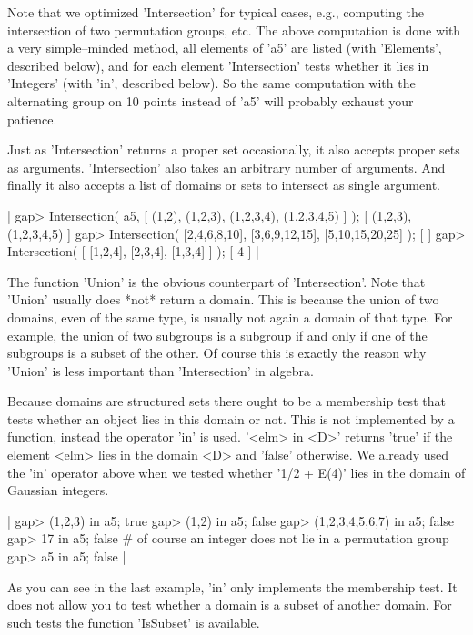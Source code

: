 Note  that we optimized 'Intersection' for typical cases, e.g., computing
the intersection  of two permutation  groups, etc.  The above computation
is  done with  a  very  simple--minded  method, all elements of  'a5' are
listed  (with   'Elements',  described  below),  and   for  each  element
'Intersection' tests  whether it lies in 'Integers' (with 'in', described
below).   So the same computation with the alternating group on 10 points
instead of 'a5' will probably exhaust your patience.

Just as 'Intersection' returns a proper set occasionally, it also accepts
proper sets as arguments.  'Intersection' also takes  an arbitrary number
of arguments.  And finally it also accepts  a list of  domains or sets to
intersect as single argument.

|    gap> Intersection( a5, [ (1,2), (1,2,3), (1,2,3,4), (1,2,3,4,5) ] );
    [ (1,2,3), (1,2,3,4,5) ]
    gap> Intersection( [2,4,6,8,10], [3,6,9,12,15], [5,10,15,20,25] );
    [  ]
    gap> Intersection( [ [1,2,4], [2,3,4], [1,3,4] ] );
    [ 4 ] |

The function 'Union' is the obvious counterpart of 'Intersection'.   Note
that 'Union' usually does *not*  return  a domain.  This  is because  the
union  of  two  domains, even  of the same type,  is usually not  again a
domain  of that type.  For example,  the  union  of  two  subgroups  is a
subgroup if  and only if  one of the subgroups is  a subset of the other.
Of course this is  exactly the reason  why 'Union' is less important than
'Intersection' in algebra.

Because  domains  are structured sets there ought to be a membership test
that tests whether an  object lies in this domain  or  not.  This is  not
implemented by a function, instead the operator 'in' is used.   '<elm> in
<D>' returns  'true' if the  element  <elm> lies  in the domain  <D>  and
'false'  otherwise.   We  already used  the 'in'  operator above  when we
tested whether '1/2 + E(4)' lies in the domain of Gaussian integers.

|    gap> (1,2,3) in a5;
    true
    gap> (1,2) in a5;
    false
    gap> (1,2,3,4,5,6,7) in a5;
    false
    gap> 17 in a5;
    false    # of course an integer does not lie in a permutation group
    gap> a5 in a5;
    false |

As  you can see in the last example, 'in' only implements the  membership
test.  It does not  allow you to test  whether  a  domain is a subset  of
another domain.  For such tests the function 'IsSubset' is available.

